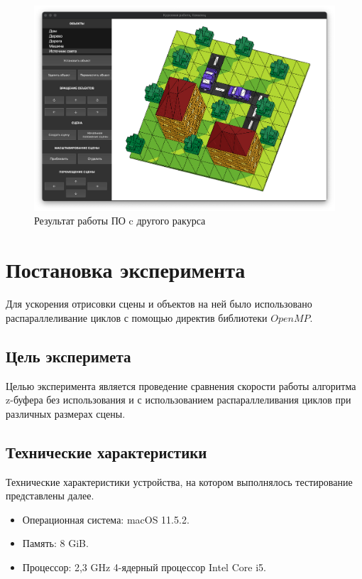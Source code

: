 \documentclass[a4paper,14pt, unknownkeysallowed]{extreport}
\begin{document}
\begin{figure}[h]
	\centering
	\includegraphics[scale=0.36]{img/example5.png}
	\caption{Результат работы ПО c другого ракурса}
	\label{fig:example5}
\end{figure} 

\clearpage

\section{Постановка эксперимента}

Для ускорения отрисовки сцены и объектов на ней было использовано распараллеливание циклов с помощью директив библиотеки $OpenMP$.

\subsection{Цель эксперимета}

Целью эксперимента является проведение сравнения скорости работы алгоритма z-буфера без использования и с использованием распараллеливания циклов при различных размерах сцены.

\subsection{Технические характеристики}

Технические характеристики устройства, на котором выполнялось тестирование представлены далее.

\begin{itemize}
    \item Операционная система: macOS 11.5.2.
    \item Память: 8 GiB.
    \item Процессор: 2,3 GHz 4-ядерный процессор Intel Core i5.
\end{itemize}
\end{document}
